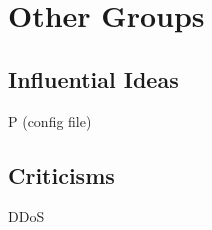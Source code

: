 \section{Other Groups}
\label{sec:groups}

\subsection{Influential Ideas}
P (config file)
\subsection{Criticisms}
DDoS

